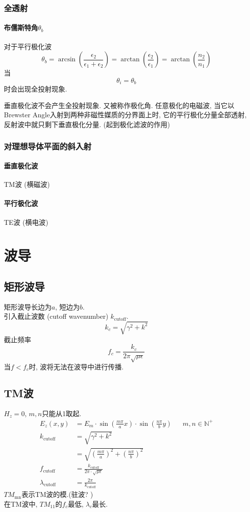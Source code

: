 \documentclass[a4paper]{report}
\begin{document}
\subsection{全透射}
\subsubsection{布儒斯特角$\theta_b$}
对于平行极化波
$$\theta_b=\arcsin(\frac{\epsilon_2}{\epsilon_1+\epsilon_2})=\arctan(\frac{\epsilon_2}{\epsilon_1})=\arctan(\frac{n_2}{n_1})$$
当$$\theta_i=\theta_b$$时会出现全投射现象. 
\par 垂直极化波不会产生全投射现象. 
又被称作极化角. 任意极化的电磁波, 当它以Brewster Angle入射到两种非磁性媒质的分界面上时, 它的平行极化分量全部透射, 反射波中就只剩下垂直极化分量. (起到极化滤波的作用)
\subsection{对理想导体平面的斜入射}
\subsubsection{垂直极化波}
TM波 (横磁波)
\subsubsection{平行极化波}
TE波 (横电波)
\chapter{波导}
\section{矩形波导}
矩形波导长边为$a$, 短边为$b$. \\
引入截止波数 (cutoff wavenumber) $k_\text{cutoff}$. 
$$k_c=\sqrt{\gamma^2+k^2}$$
截止频率
$$f_c=\frac{k_c}{2\pi\sqrt{\mu\epsilon}}$$
当$f<f_c$时, 波将无法在波导中进行传播. 
\section{TM波}
$H_z=0$, $m,n$只能从1取起. 
\begin{align*}
    E_z(x,y)&=E_m\cdot \sin(\frac{m\pi}{a}x)\cdot \sin(\frac{n\pi}{b}y)&& m,n\in\mathbb{N}^+ \\
    k_\text{cutoff}&=\sqrt{\gamma^2+k^2}\\
    &=\sqrt{(\frac{m\pi}{a})^2+(\frac{n\pi}{b})^2}\\
    f_{\text{cutoff}}&=\frac{k_\text{cutoff}}{2\pi\cdot\sqrt{\mu\epsilon}}\\
    \lambda_\text{cutoff}&=\frac{2\pi}{k_\text{cutoff}}
\end{align*}
$TM_\text{mn}$表示TM波的模.(驻波? )\\
在TM波中, $TM_\text{11}$的$f_c$最低, $\lambda_c$最长. 
\end{document}
